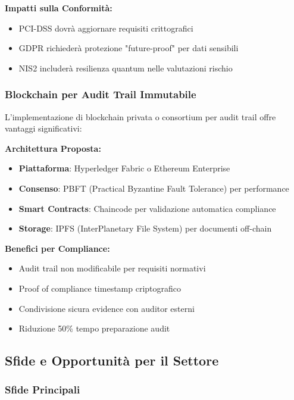 \textbf{Impatti sulla Conformità:}
\begin{itemize}
    \item PCI-DSS dovrà aggiornare requisiti crittografici
    \item GDPR richiederà protezione "future-proof" per dati sensibili
    \item NIS2 includerà resilienza quantum nelle valutazioni rischio
\end{itemize}

\subsubsection{Blockchain per Audit Trail Immutabile}

L'implementazione di blockchain privata o consortium per audit trail offre vantaggi significativi:

\textbf{Architettura Proposta:}
\begin{itemize}
    \item \textbf{Piattaforma}: Hyperledger Fabric o Ethereum Enterprise
    \item \textbf{Consenso}: PBFT (Practical Byzantine Fault Tolerance) per performance
    \item \textbf{Smart Contracts}: Chaincode per validazione automatica compliance
    \item \textbf{Storage}: IPFS (InterPlanetary File System) per documenti off-chain
\end{itemize}

\textbf{Benefici per Compliance:}
\begin{itemize}
    \item Audit trail non modificabile per requisiti normativi
    \item Proof of compliance timestamp criptografico
    \item Condivisione sicura evidence con auditor esterni
    \item Riduzione 50\% tempo preparazione audit
\end{itemize}

\subsection{Sfide e Opportunità per il Settore}

\subsubsection{Sfide Principali}

